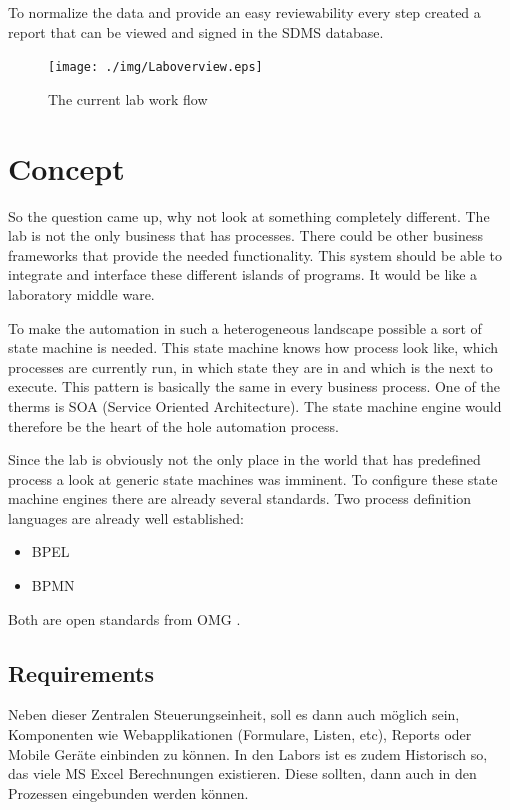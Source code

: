 \documentclass[paper=a4,twoside=false,BCOR=0mm,DIV=calc,fontsize=12pt]{scrartcl}
\begin{document}
To normalize the data and provide an easy reviewability every step created a report that can be viewed and signed in the SDMS database.

\begin{figure}
    \begin{center}
      \texttt{[image: ./img/Laboverview.eps]}\\
    \end{center}
  \caption{The current lab work flow}
  \label{CurrentLabWorkflow}
\end{figure} 




\section{Concept}
So the question came up, why not look at something completely different. The lab is not the only business that has processes. There could be other business frameworks that provide the needed functionality. This system should be able to integrate and interface these different islands of programs. It would be like a laboratory middle ware.

To make the automation in such a heterogeneous landscape possible a sort of state machine is needed. This state machine knows how process
look like, which processes are currently run, in which state they are in and which is the next to execute.
This pattern is basically the same in every business process. One of the therms is SOA (Service Oriented Architecture). The state machine engine would therefore be the heart of the hole automation process.

Since the lab is obviously not the only place in the world that has predefined process a look at generic state machines was imminent.
To configure these state  machine engines there are already several standards. Two process definition languages are already well established:

\begin{itemize}
 \item BPEL
 \item BPMN
\end{itemize}

Both are open standards from OMG \cite{omg}.


\subsection{Requirements}
Neben dieser Zentralen Steuerungseinheit, soll es dann auch möglich sein, Komponenten wie Webapplikationen (Formulare, Listen, etc),
Reports oder Mobile Geräte einbinden zu können. In den Labors ist es zudem Historisch so, das viele MS Excel Berechnungen existieren. Diese
sollten, dann auch in den Prozessen eingebunden werden können.
\end{document}
